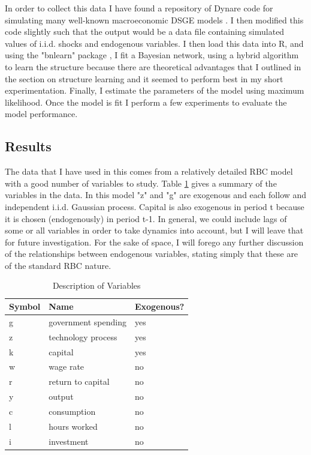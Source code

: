 \documentclass{article}
\begin{document}
In order to collect this data I have found a repository of Dynare code for simulating many well-known macroeconomic DSGE models \parencite{pfeifer2020}. I then modified this code slightly such that the output would be a data file containing simulated values of i.i.d. shocks and endogenous variables. I then load this data into R, and using the "bnlearn" package \parencite{scutari2020}, I fit a Bayesian network, using a hybrid algorithm to learn the structure because there are theoretical advantages that I outlined in the section on structure learning and it seemed to perform best in my short experimentation. Finally, I estimate the parameters of the model using maximum likelihood. Once the model is fit I perform a few experiments to evaluate the model performance.

\subsection{Results}

The data that I have used in this comes from a relatively detailed RBC model with a good number of variables to study. Table \ref{tab1} gives a summary of the variables in the data. In this model "z" and "g" are exogenous and each follow and independent i.i.d. Gaussian process. Capital is also exogenous in period t because it is chosen (endogenously) in period t-1. In general, we could include lags of some or all variables in order to take dynamics into account, but I will leave that for future investigation. For the sake of space, I will forego any further discussion of the relationships between endogenous variables, stating simply that these are of the standard RBC nature.

\begin{table}
  \centering
  \begin{tabular}{|l|l|l|}
    \hline
    Symbol & Name & Exogenous? \\
    \hline
    g & government spending & yes \\
    z & technology process & yes \\
    k & capital & yes \\
    w & wage rate & no \\
    r & return to capital & no \\
    y & output & no \\
    c & consumption & no \\
    l & hours worked & no \\
    i & investment & no \\ \cline{2-2}
    \hline
  \end{tabular}
  \caption{Description of Variables}
  \label{tab1}
\end{table}
\end{document}
